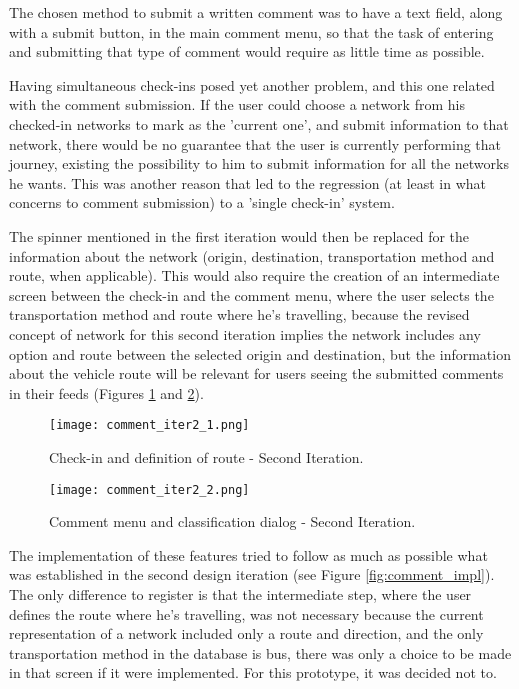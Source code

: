 The chosen method to submit a written comment was to have a text field, along with a submit button, in the main comment menu, so that the task of entering and submitting that type of comment would require as little time as possible.



Having simultaneous check-ins posed yet another problem, and this one related with the comment submission. If the user could choose a network from his checked-in networks to mark as the 'current one', and submit information to that network, there would be no guarantee that the user is currently performing that journey, existing the possibility to him to submit information for all the networks he wants. This was another reason that led to the regression (at least in what concerns to comment submission) to a 'single check-in' system.

The spinner mentioned in the first iteration would then be replaced for the information about the network (origin, destination, transportation method and route, when applicable). This would also require the creation of an intermediate screen between the check-in and the comment menu, where the user selects the transportation method and route where he's travelling, because the revised concept of network for this second iteration implies the network includes any option and route between the selected origin and destination, but the information about the vehicle route will be relevant for users seeing the submitted comments in their feeds (Figures \ref{fig:comment_iter2_1} and \ref{fig:comment_iter2_2}).

\begin{figure}[h!]
  \begin{center}
    \leavevmode
    \texttt{[image: comment\_iter2\_1.png]}
    \caption{Check-in and definition of route - Second Iteration.}
    \label{fig:comment_iter2_1}
  \end{center}
\end{figure}

\begin{figure}[h!]
  \begin{center}
    \leavevmode
    \texttt{[image: comment\_iter2\_2.png]}
    \caption{Comment menu and classification dialog - Second Iteration.}
    \label{fig:comment_iter2_2}
  \end{center}
\end{figure}

\newpage

The implementation of these features tried to follow as much as possible what was established in the second design iteration (see Figure \ref{fig:comment_impl}). The only difference to register is that the intermediate step, where the user defines the route where he's travelling, was not necessary because the current representation of a network included only a route and direction, and the only transportation method in the database is bus, there was only a choice to be made in that screen if it were implemented. For this prototype, it was decided not to.

